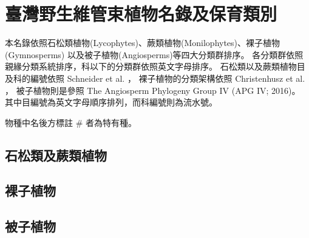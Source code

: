 \chapter{臺灣野生維管束植物名錄及保育類別}

\linespread{1.5}\selectfont
本名錄依照石松類植物(Lycophytes)、蕨類植物(Monilophytes)、裸子植物(Gymnosperms)
以及被子植物(Angiosperms)等四大分類群排序。
各分類群依照親緣分類系統排序，科以下的分類群依照英文字母排序。
石松類以及蕨類植物目及科的編號依照 Schneider et al. \citeyearpar{Schneider:2016hr}，
裸子植物的分類架構依照 Christenhusz et al. \citeyearpar{Christenhusz:2011wm}，
被子植物則是參照 The Angiosperm Phylogeny Group IV (APG IV; 2016)。
其中目編號為英文字母順序排列，而科編號則為流水號。

\linespread{1}\selectfont
\noindent 物種中名後方標註 \# 者為特有種。\\
\begin{multicols}{2}
\section{石松類及蕨類植物}

\section{裸子植物}

\section{被子植物}

\end{multicols}
